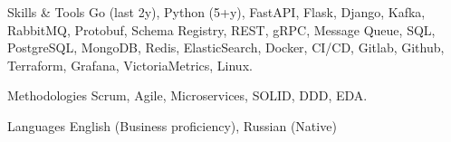 
\begin{cvskills}

  \cvskill
    {Skills \& Tools} %
    {Go (last 2y), Python (5+y), FastAPI, Flask, Django, Kafka, RabbitMQ, Protobuf, Schema Registry, REST, gRPC, Message Queue, SQL, PostgreSQL, MongoDB, Redis, ElasticSearch, Docker, CI/CD, Gitlab, Github, Terraform, Grafana, VictoriaMetrics, Linux.} %

  \cvskill
    {Methodologies} %
    {Scrum, Agile, Microservices, SOLID, DDD, EDA.} %

  \cvskill
    {Languages} %
    {English (Business proficiency), Russian (Native)} %

\end{cvskills}
